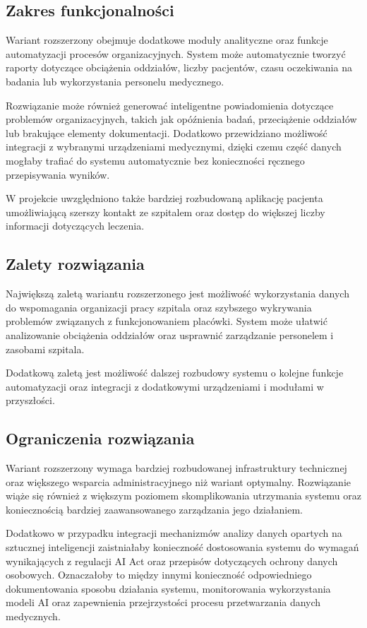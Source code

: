 \subsection{Zakres funkcjonalności}
Wariant rozszerzony obejmuje dodatkowe moduły analityczne oraz funkcje automatyzacji procesów organizacyjnych. System może automatycznie tworzyć raporty dotyczące obciążenia oddziałów, liczby pacjentów, czasu oczekiwania na badania lub wykorzystania personelu medycznego.

Rozwiązanie może również generować inteligentne powiadomienia dotyczące problemów organizacyjnych, takich jak opóźnienia badań, przeciążenie oddziałów lub brakujące elementy dokumentacji. Dodatkowo przewidziano możliwość integracji z wybranymi urządzeniami medycznymi, dzięki czemu część danych mogłaby trafiać do systemu automatycznie bez konieczności ręcznego przepisywania wyników.

W projekcie uwzględniono także bardziej rozbudowaną aplikację pacjenta umożliwiającą szerszy kontakt ze szpitalem oraz dostęp do większej liczby informacji dotyczących leczenia.
\subsection{Zalety rozwiązania}
Największą zaletą wariantu rozszerzonego jest możliwość wykorzystania danych do wspomagania organizacji pracy szpitala oraz szybszego wykrywania problemów związanych z funkcjonowaniem placówki. System może ułatwić analizowanie obciążenia oddziałów oraz usprawnić zarządzanie personelem i zasobami szpitala.

Dodatkową zaletą jest możliwość dalszej rozbudowy systemu o kolejne funkcje automatyzacji oraz integracji z dodatkowymi urządzeniami i modułami w przyszłości.
\subsection{Ograniczenia rozwiązania}
Wariant rozszerzony wymaga bardziej rozbudowanej infrastruktury technicznej oraz większego wsparcia administracyjnego niż wariant optymalny. Rozwiązanie wiąże się również z większym poziomem skomplikowania utrzymania systemu oraz koniecznością bardziej zaawansowanego zarządzania jego działaniem.

Dodatkowo w przypadku integracji mechanizmów analizy danych opartych na sztucznej inteligencji zaistniałaby konieczność dostosowania systemu do wymagań wynikających z regulacji AI Act oraz przepisów dotyczących ochrony danych osobowych. Oznaczałoby to między innymi konieczność odpowiedniego dokumentowania sposobu działania systemu, monitorowania wykorzystania modeli AI oraz zapewnienia przejrzystości procesu przetwarzania danych medycznych.


